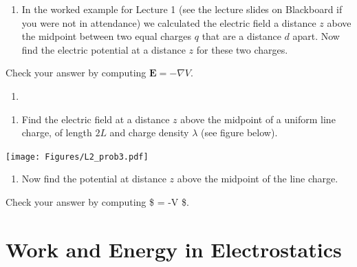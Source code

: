\documentclass[
  letterpaper,
  DIV=11,
  numbers=noendperiod]{scrreprt}
\providecommand{\tightlist}{%
  \setlength{\itemsep}{0pt}\setlength{\parskip}{0pt}}\usepackage{longtable,booktabs,array}
\begin{document}
\begin{enumerate}
\def\labelenumi{\arabic{enumi})}
\setcounter{enumi}{1}
\tightlist
\item
  In the worked example for Lecture 1 (see the lecture slides on
  Blackboard if you were not in attendance) we calculated the electric
  field a distance \(z\) above the midpoint between two equal charges
  \(q\) that are a distance \(d\) apart. Now find the electric potential
  at a distance \(z\) for these two charges.
\end{enumerate}

Check your answer by computing \(\mathrm{\mathbf{E}}= -\nabla V\).

\begin{enumerate}
\def\labelenumi{\arabic{enumi})}
\setcounter{enumi}{2}
\tightlist
\item
\end{enumerate}

\begin{enumerate}
\def\labelenumi{(\alph{enumi})}
\tightlist
\item
  Find the electric field at a distance \(z\) above the midpoint of a
  uniform line charge, of length \(2L\) and charge density \(\lambda\)
  (see figure below).
\end{enumerate}

\texttt{[image: Figures/L2\_prob3.pdf]}

\begin{enumerate}
\def\labelenumi{(\alph{enumi})}
\setcounter{enumi}{1}
\tightlist
\item
  Now find the potential at distance \(z\) above the midpoint of the
  line charge.
\end{enumerate}

Check your answer by computing \$ = -\nabla V \$.


\chapter{Work and Energy in
Electrostatics}\label{work-and-energy-in-electrostatics}

\newcommand{\l}{\mathrm{\mathbf{l}}}
\newcommand{\E}{\mathrm{\mathbf{E}}}
\newcommand{\F}{\mathrm{\mathbf{F}}}
\newcommand{\r}{\mathrm{\mathbf{r}}}

\newcommand{\x}{\mathrm{\mathbf{x}}}
\newcommand{\y}{\mathrm{\mathbf{y}}}
\newcommand{\z}{\mathrm{\mathbf{z}}}
\newcommand{\p}{\mathrm{\mathbf{p}}}
\newcommand{\d}{\mathrm{\mathbf{d}}}
\end{document}
